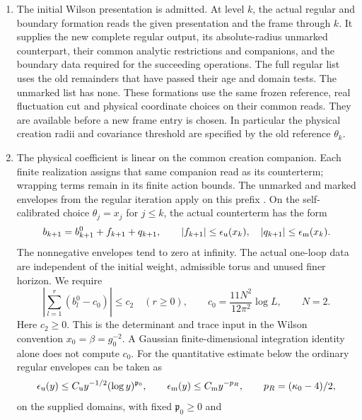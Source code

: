 \documentclass[11pt,letterpaper,reqno]{amsart}
\numberwithin{equation}{section}
\theoremstyle{definition}
\theoremstyle{remark}
\begin{document}
\begin{enumerate}
\item The initial Wilson presentation is admitted. At level \(k\),
  the actual regular and boundary formation reads the given
  presentation and the frame through \(k\). It supplies the new
  complete regular output, its absolute-radius unmarked counterpart,
  their common analytic restrictions and companions, and the boundary
  data required for the succeeding operations. The full regular list
  uses the old remainders that have passed their age and domain tests.
  The unmarked list has none. These formations use the same frozen
  reference, real fluctuation cut and physical coordinate choices
  on their common reads. They are available before a new frame entry
  is chosen. In particular the physical creation radii and covariance
  threshold are specified by the old reference \(\theta_k\).
\item The physical coefficient is linear on the common creation
companion. Each finite realization assigns that same companion read
as its counterterm; wrapping terms remain in its finite action bounds.
The unmarked and marked envelopes from the regular
  iteration apply on this prefix \cite[Sections~3--6]{EM}. On the
  self-calibrated choice \(\theta_j=x_j\) for \(j\le k\), the actual
  counterterm has the form
  \begin{equation}\label{rt:eq-trajectory-increment}
     b_{k+1}=b_{k+1}^0+f_{k+1}+q_{k+1},\qquad
     |f_{k+1}|\le\epsilon_{\rm u}(x_k),\quad
     |q_{k+1}|\le\epsilon_{\rm m}(x_k).
  \end{equation}
  The nonnegative envelopes tend to zero at infinity. The actual
  one-loop data are independent of the initial weight, admissible
  torus and unused finer horizon. We require
  \begin{equation}\label{rt:eq-one-loop-input}
     \left|\sum_{l=1}^r(b_l^0-c_0)\right|\le c_2
           \quad(r\ge0),\qquad
     c_0=\frac{11N^2}{12\pi^2}\log L,\qquad N=2 .
  \end{equation}
  Here \(c_2\ge0\). This is the determinant and trace input in the
  Wilson convention \(x_0=\beta=g_0^{-2}\). A Gaussian
  finite-dimensional integration identity alone does not compute
  \(c_0\). For the quantitative estimate below the ordinary regular
  envelopes can be taken as
  \[
     \epsilon_{\rm u}(y)\le C_{\rm u}y^{-1/2}(\log y)^{\mathfrak p_0},
     \qquad
     \epsilon_{\rm m}(y)\le C_{\rm m}y^{-p_R},
     \qquad p_R=(\kappa_0-4)/2 ,
  \]
  on the supplied domains, with fixed \(\mathfrak p_0\ge0\) and

\end{enumerate}
\end{document}
